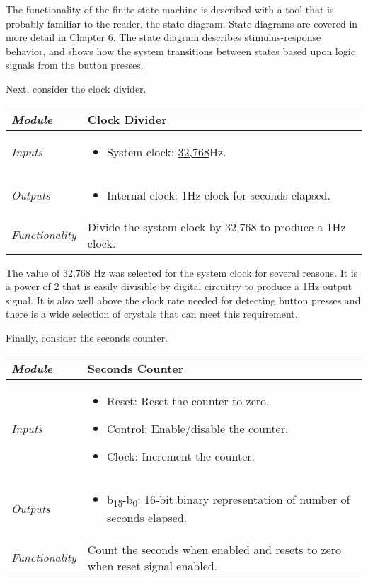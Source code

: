 The functionality of the finite state machine is described with a tool
that is probably familiar to the reader, the state diagram. State
diagrams are covered in more detail in Chapter 6. The state diagram
describes stimulus-response behavior, and shows how the system
transitions between states based upon logic signals from the button
presses.

Next, consider the clock divider.


\begin{table}
\label{table:level1HighGainAmp}
\begin{tabular}{|l|m{10cm}|}
\hline
\emph{Module} & Clock Divider\\ \hline
\emph{Inputs} & 
\begin{itemize}
\item
  System clock: \ul{32,768}Hz.
\end{itemize}\\ \hline

\emph{Outputs} & 
\begin{itemize}
\item
  Internal clock: 1Hz clock for seconds elapsed.
\end{itemize} \\ \hline
\emph{Functionality} & Divide the system clock by 32,768 to produce a
1Hz clock. \\ \hline
\end{tabular}
\end{table}

The value of 32,768 Hz was selected for the system clock for several
reasons. It is a power of 2 that is easily divisible by digital
circuitry to produce a 1Hz output signal. It is also well above the
clock rate needed for detecting button presses and there is a wide
selection of crystals that can meet this requirement.

Finally, consider the seconds counter.


\begin{table}
\label{table:level1HighGainAmp}
\begin{tabular}{|l|m{10cm}|}
\hline
\emph{Module} & Seconds Counter\\ \hline
\emph{Inputs} & 
\begin{itemize}
\item
  Reset: Reset the counter to zero.
\item
  Control: Enable/disable the counter.
\item
  Clock: Increment the counter.
\end{itemize}\\ \hline

\emph{Outputs} & 
\begin{itemize}
\item
  b\textsubscript{15}-b\textsubscript{0}: 16-bit binary representation
  of number of seconds elapsed.
\end{itemize}\\ \hline
\emph{Functionality} & Count the seconds when enabled and resets to zero
when reset signal enabled. \\ \hline
\end{tabular}
\end{table}



